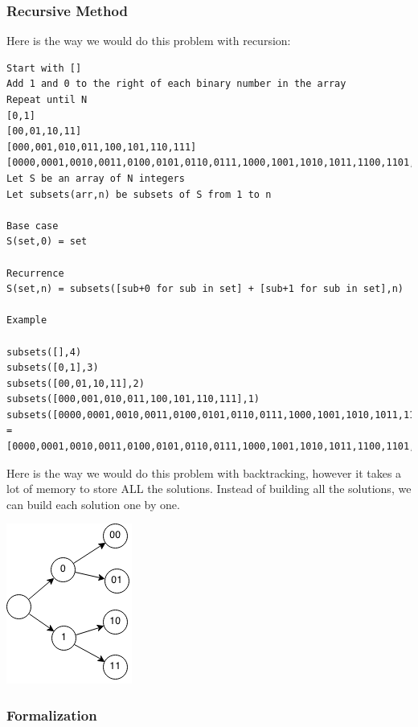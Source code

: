 \documentclass[11pt,oneside]{book}
\makeatletter
\def\maxwidth#1{\ifdim\Gin@nat@width>#1 #1\else\Gin@nat@width\fi}
\makeatother
\begin{document}
\subsubsection{Recursive Method}

Here is the way we would do this problem with recursion:

\begin{lstlisting}
Start with []
Add 1 and 0 to the right of each binary number in the array
Repeat until N
[0,1]
[00,01,10,11]
[000,001,010,011,100,101,110,111]
[0000,0001,0010,0011,0100,0101,0110,0111,1000,1001,1010,1011,1100,1101,1110,1111]
Let S be an array of N integers
Let subsets(arr,n) be subsets of S from 1 to n
 
Base case
S(set,0) = set
 
Recurrence
S(set,n) = subsets([sub+0 for sub in set] + [sub+1 for sub in set],n)
 
Example
 
subsets([],4)
subsets([0,1],3)
subsets([00,01,10,11],2)
subsets([000,001,010,011,100,101,110,111],1)
subsets([0000,0001,0010,0011,0100,0101,0110,0111,1000,1001,1010,1011,1100,1101,1110,1111],0)
=
[0000,0001,0010,0011,0100,0101,0110,0111,1000,1001,1010,1011,1100,1101,1110,1111]
 \end{lstlisting}

Here is the way we would do this problem with backtracking, however it takes a lot of memory to store ALL the solutions. Instead of building all the solutions, we can build each solution one by one.

\includegraphics[width=\maxwidth{\textwidth}]{enumerate-sets.png}

\subsubsection{Formalization}
\end{document}
